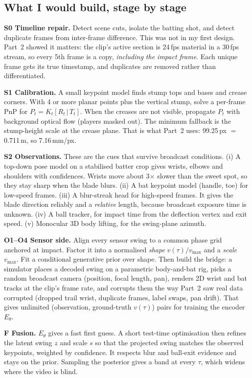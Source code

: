 \documentclass[11pt,a4paper]{article}
\begin{document}
\subsection{What I would build, stage by stage}
\textbf{S0 Timeline repair.} Detect scene cuts, isolate the batting shot, and detect duplicate frames from inter-frame difference. This was not in my first design. Part~2 showed it matters: the clip's active section is 24\,fps material in a 30\,fps stream, so every 5th frame is a copy, \emph{including the impact frame}. Each unique frame gets its true timestamp, and duplicates are removed rather than differentiated.

\textbf{S1 Calibration.} A small keypoint model finds stump tops and bases and crease corners. With 4 or more planar points plus the vertical stump, solve a per-frame PnP for $P_t=K_t[R_t\,|\,T_t]$. When the creases are not visible, propagate $P_t$ with background optical flow (players masked out). The minimum fallback is the stump-height scale at the crease plane. That is what Part~2 uses: 99.25\,px $=$ 0.711\,m, so 7.16\,mm/px.

\textbf{S2 Observations.} These are the cues that survive broadcast conditions. (i) A top-down pose model on a stabilised batter crop gives wrists, elbows and shoulders with confidences. Wrists move about 3$\times$ slower than the sweet spot, so they stay sharp when the blade blurs. (ii) A bat keypoint model (handle, toe) for low-speed frames. (iii) A blur-streak head for high-speed frames. It gives the blade direction reliably and a \emph{relative} length, because broadcast exposure time is unknown. (iv) A ball tracker, for impact time from the deflection vertex and exit speed. (v) Monocular 3D body lifting, for the swing-plane azimuth.

\textbf{O1--O4 Sensor side.} Align every sensor swing to a common phase grid anchored at impact. Factor it into a normalised \emph{shape} $v(\tau)/v_{\max}$ and a \emph{scale} $v_{\max}$. Fit a conditional generative prior over shape. Then build the bridge: a simulator places a decoded swing on a parametric body-and-bat rig, picks a random broadcast camera (position, focal length, pan), renders 2D wrist and bat tracks at the clip's frame rate, and corrupts them the way Part~2 saw real data corrupted (dropped trail wrist, duplicate frames, label swaps, pan drift). That gives unlimited (observation, ground-truth $v(\tau)$) pairs for training the encoder $E_\theta$.

\textbf{F Fusion.} $E_\theta$ gives a fast first guess. A short test-time optimisation then refines the latent swing $z$ and scale $s$ so that the projected swing matches the observed keypoints, weighted by confidence. It respects blur and ball-exit evidence and stays on the prior. Sampling the posterior gives a band at every $\tau$, which widens where the video is blind.
\end{document}
